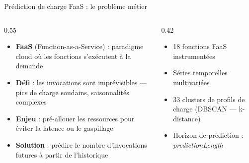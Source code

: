 \documentclass[10pt]{beamer}
\begin{document}
\begin{frame}{Prédiction de charge FaaS : le problème métier}
  \begin{columns}
    \begin{column}{0.55\textwidth}
      \begin{itemize}
        \item \textbf{FaaS} (Function-as-a-Service) : paradigme cloud où les fonctions
              s'exécutent à la demande
        \item \textbf{Défi} : les invocations sont imprévisibles ---
              pics de charge soudains, saisonnalités complexes
        \item \textbf{Enjeu} : pré-allouer les ressources pour éviter la latence
              ou le gaspillage
        \item \textbf{Solution} : prédire le nombre d'invocations futures
              à partir de l'historique
      \end{itemize}
    \end{column}
    \begin{column}{0.42\textwidth}
      \begin{tcolorbox}[
      	title=Dataset FAYAM,
      	colback=blue!5,
      	colframe=blue!50!black,
      	arc=3mm,
      	fonttitle=\bfseries
      	]
      	\begin{itemize}
      		\item 18 fonctions FaaS instrumentées
      		\item Séries temporelles multivariées
      		\item 33 clusters de profils de charge
      		(DBSCAN --- k-distance)
      		\item Horizon de prédiction : \textit{predictionLength}
      	\end{itemize}
      \end{tcolorbox}
    \end{column}
  \end{columns}
\end{frame}
\end{document}
